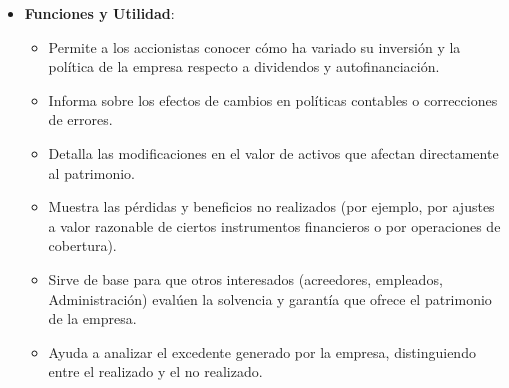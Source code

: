 \documentclass[
  paper=a4,
  ,captions=tableheading
]{scrbook}
\providecommand{\tightlist}{%
  \setlength{\itemsep}{0pt}\setlength{\parskip}{0pt}}
\begin{document}
\begin{itemize}
\tightlist
\item
  \textbf{Funciones y Utilidad}:

  \begin{itemize}
  \tightlist
  \item
    Permite a los accionistas conocer cómo ha variado su inversión y la
    política de la empresa respecto a dividendos y autofinanciación.
  \item
    Informa sobre los efectos de cambios en políticas contables o
    correcciones de errores.
  \item
    Detalla las modificaciones en el valor de activos que afectan
    directamente al patrimonio.
  \item
    Muestra las pérdidas y beneficios no realizados (por ejemplo, por
    ajustes a valor razonable de ciertos instrumentos financieros o por
    operaciones de cobertura).
  \item
    Sirve de base para que otros interesados (acreedores, empleados,
    Administración) evalúen la solvencia y garantía que ofrece el
    patrimonio de la empresa.
  \item
    Ayuda a analizar el excedente generado por la empresa, distinguiendo
    entre el realizado y el no realizado.
  \end{itemize}
\end{itemize}

\backmatter
\end{document}
